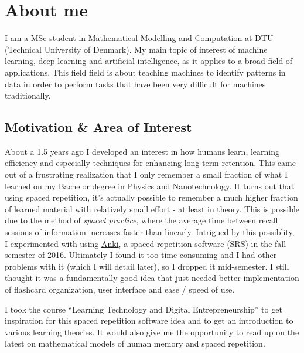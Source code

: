 \newpage

\section{About me}\label{about-me}

I am a MSc student in Mathematical Modelling and Computation at DTU
(Technical University of Denmark). My main topic of interest of machine
learning, deep learning and artificial intelligence, as it applies to a
broad field of applications. This field field is about teaching machines
to identify patterns in data in order to perform tasks that have been
very difficult for machines traditionally.

\subsection{Motivation \& Area of
Interest}\label{motivation-area-of-interest}

About a 1.5 years ago I developed an interest in how humans learn,
learning efficiency and especially techniques for enhancing long-term
retention. This came out of a frustrating realization that I only
remember a small fraction of what I learned on my Bachelor degree in
Physics and Nanotechnology. It turns out that using spaced repetition,
it's actually possible to remember a much higher fraction of learned
material with relatively small effort - at least in theory. This is
possible due to the method of \emph{spaced practice}, where the average
time between recall sessions of information increases faster than
linearly. Intrigued by this possiblity, I experimented with using
\href{https://apps.ankiweb.net}{Anki}, a spaced repetition software
(SRS) in the fall semester of 2016. Ultimately I found it too time
consuming and I had other problems with it (which I will detail later),
so I dropped it mid-semester. I still thought it was a fundamentally
good idea that just needed better implementation of flashcard
organization, user interface and ease / speed of use.

I took the course ``Learning Technology and Digital Entrepreneurship''
to get inspiration for this spaced repetition software idea and to get
an introduction to various learning theories. It would also give me the
opportunity to read up on the latest on mathematical models of human
memory and spaced repetition.

